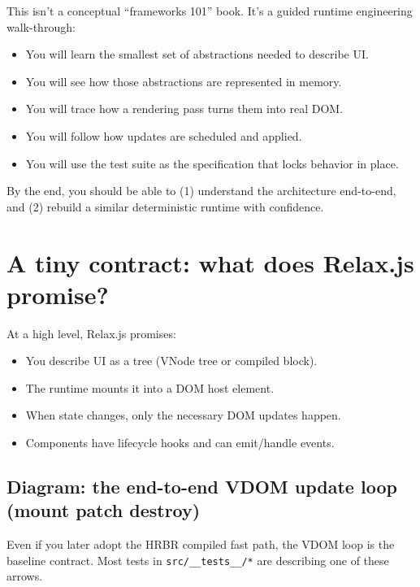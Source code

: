 This isn't a conceptual ``frameworks 101'' book.
It's a guided runtime engineering walk-through:

\begin{itemize}
  \item You will learn the smallest set of abstractions needed to describe UI.
  \item You will see how those abstractions are represented in memory.
  \item You will trace how a rendering pass turns them into real DOM.
  \item You will follow how updates are scheduled and applied.
  \item You will use the test suite as the specification that locks behavior in place.
\end{itemize}

By the end, you should be able to (1) understand the architecture end-to-end, and (2) rebuild a similar deterministic runtime with confidence.

\section{A tiny contract: what does Relax.js promise?}
At a high level, Relax.js promises:

\begin{itemize}
  \item You describe UI as a tree (VNode tree or compiled block).
  \item The runtime mounts it into a DOM host element.
  \item When state changes, only the necessary DOM updates happen.
  \item Components have lifecycle hooks and can emit/handle events.
\end{itemize}

\subsection*{Diagram: the end-to-end VDOM update loop (mount \textrightarrow patch \textrightarrow destroy)}
Even if you later adopt the HRBR compiled fast path, the VDOM loop is the baseline contract. Most tests in \texttt{src/\_\_tests\_\_/*} are describing one of these arrows.

